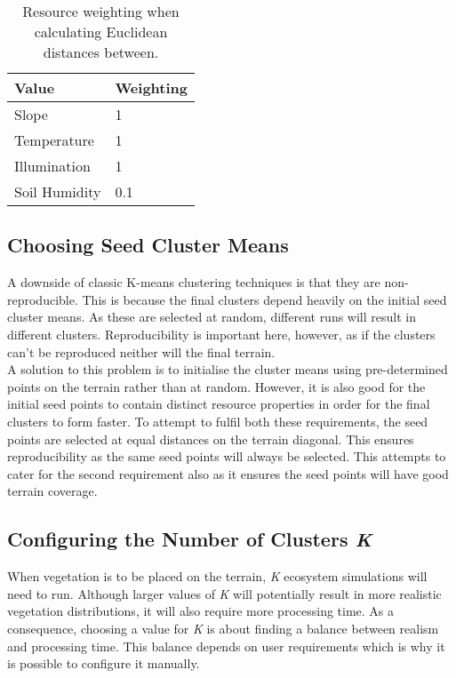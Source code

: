 \begin{table}[h]
  \centering
	    \begin{tabular}{|p{6cm}|p{3cm}|}
		\hline	
  	    \textbf{Value} & \textbf{Weighting} \\
  	    \hline	
  	    Slope & 1 \\
		\hline
  	    Temperature & 1 \\
		\hline
  	    Illumination & 1 \\
		\hline
  	    Soil Humidity & 0.1 \\
		\hline
		\end{tabular}
		\caption{Resource weighting when calculating Euclidean distances between.}
	  \label{tab:resource_weighting}
\end{table}

\subsection{Choosing Seed Cluster Means}

A downside of classic K-means clustering techniques is that they are non-reproducible. This is because the final clusters depend heavily on the initial seed cluster means. As these are selected at random, different runs will result in different clusters. Reproducibility is important here, however, as if the clusters can't be reproduced neither will the final terrain. \\

A solution to this problem is to initialise the cluster means using pre-determined points on the terrain rather than at random. However, it is also good for the initial seed points to contain distinct resource properties in order for the final clusters to form faster. To attempt to fulfil both these requirements, the seed points are selected at equal distances on the terrain diagonal. This ensures reproducibility as the same seed points will always be selected. This attempts to cater for the second requirement also as it ensures the seed points will have good terrain coverage.

\subsection{Configuring the Number of Clusters \textit{K}}

When vegetation is to be placed on the terrain, \textit{K} ecosystem simulations will need to run. Although larger values of \textit{K} will potentially result in more realistic vegetation distributions, it will also require more processing time. As a consequence, choosing a value for \textit{K} is about finding a balance between realism and processing time. This balance depends on user requirements which is why it is possible to configure it manually. 

